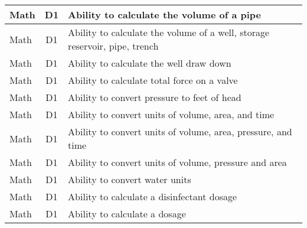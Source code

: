 \documentclass{article}
\begin{document}
\begin{table}[]
\begin{tabular}{|l|c|l|}
Math                                   & D1             & Ability to calculate   the volume of a pipe                                                                                       \\ \hline
Math                                   & D1             & Ability to calculate   the volume of a well, storage reservoir, pipe, trench                                                      \\ \hline
Math                                   & D1             & Ability to calculate   the well draw down                                                                                         \\ \hline
Math                                   & D1             & Ability to calculate   total force on a valve                                                                                     \\ \hline
Math                                   & D1             & Ability to convert   pressure to feet of head                                                                                     \\ \hline
Math                                   & D1             & Ability to convert   units of volume, area, and time                                                                              \\ \hline
Math                                   & D1             & Ability to convert   units of volume, area, pressure, and time                                                                    \\ \hline
Math                                   & D1             & Ability to convert   units of volume, pressure and area                                                                           \\ \hline
Math                                   & D1             & Ability to convert   water units                                                                                                  \\ \hline
Math                                   & D1             & Ability to calculate   a disinfectant dosage                                                                                      \\ \hline
Math                                   & D1             & Ability to calculate   a dosage                                                                                                   \\ \hline

\end{tabular}
\end{table}
\end{document}
